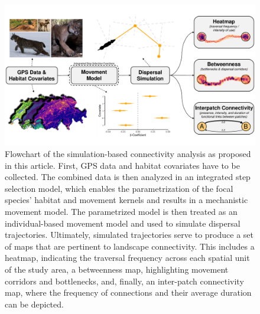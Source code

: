 \documentclass[abstract=on,10pt,a4paper,bibliography=totocnumbered]{article}
\begin{document}
\begin{figure}[htbp]
  \begin{center}
    \includegraphics[width = \textwidth]{99_GraphicalAbstract.pdf}
    \caption{Flowchart of the simulation-based connectivity analysis as proposed
    in this article. First, GPS data and habitat covariates have to be
    collected. The combined data is then analyzed in an integrated step
    selection model, which enables the parametrization of the focal species'
    habitat and movement kernels and results in a mechanistic movement model.
    The parametrized model is then treated as an individual-based movement model
    and used to simulate dispersal trajectories. Ultimately, simulated
    trajectories serve to produce a set of maps that are pertinent to landscape
    connectivity. This includes a heatmap, indicating the traversal frequency
    across each spatial unit of the study area, a betweenness map, highlighting
    movement corridors and bottlenecks, and, finally, an inter-patch
    connectivity map, where the frequency of connections and their average
    duration can be depicted.}
    \label{GraphicalAbstract}
  \end{center}
\end{figure}

\end{document}

